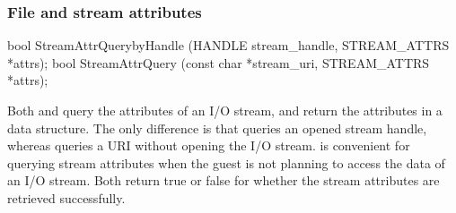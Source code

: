 








\subsubsection*{File and stream attributes}


\begin{paldef}
bool StreamAttrQuerybyHandle (HANDLE stream_handle,
                              STREAM_ATTRS *attrs);
bool StreamAttrQuery (const char *stream_uri,
                      STREAM_ATTRS *attrs);

\end{paldef}

Both  and  query the attributes of an I/O stream, and return the attributes in a  data structure.
The only difference is that  queries an opened stream handle,
whereas  queries a URI without opening the I/O stream.
 is convenient for querying stream attributes when the guest is not planning to access the data of an I/O stream.
Both \hostapis{} return true or false for whether the stream attributes are retrieved successfully.




